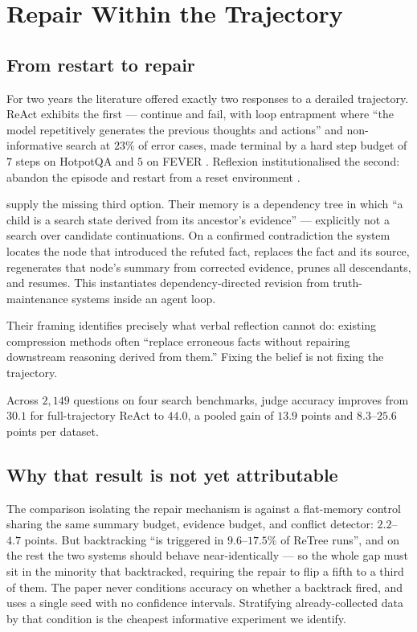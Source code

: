 \documentclass[10pt,twocolumn,a4paper]{article}
\begin{document}
\section{Repair Within the Trajectory}
\label{sec:repair}

\subsection{From restart to repair}

For two years the literature offered exactly two responses to a derailed trajectory.
ReAct exhibits the first --- continue and fail, with loop entrapment where ``the model
repetitively generates the previous thoughts and actions'' and non-informative search at
$23\%$ of error cases, made terminal by a hard step budget of $7$ steps on HotpotQA and $5$
on FEVER \citep{yao2023reactsynergizingreasoningacting}.
Reflexion institutionalised the second: abandon the episode and restart from a reset
environment \citep{shinn2023reflexionlanguageagentsverbal}.

\citet{yang2026selfcorrectinglonghorizonsearchagents} supply the missing third option.
Their memory is a dependency tree in which ``a child is a search state derived from its
ancestor's evidence'' --- explicitly not a search over candidate continuations.
On a confirmed contradiction the system locates the node that introduced the refuted fact,
replaces the fact and its source, regenerates that node's summary from corrected evidence,
prunes all descendants, and resumes.
This instantiates dependency-directed revision from truth-maintenance systems inside an
agent loop.

Their framing identifies precisely what verbal reflection cannot do: existing compression
methods often ``replace erroneous facts without repairing downstream reasoning derived from
them.''
Fixing the belief is not fixing the trajectory.

Across $2{,}149$ questions on four search benchmarks, judge accuracy improves from $30.1$
for full-trajectory ReAct to $44.0$, a pooled gain of $13.9$ points and $8.3$--$25.6$ points
per dataset.

\subsection{Why that result is not yet attributable}

The comparison isolating the repair mechanism is against a flat-memory control sharing the
same summary budget, evidence budget, and conflict detector: $2.2$--$4.7$ points.
But backtracking ``is triggered in $9.6$--$17.5\%$ of ReTree runs'', and on the rest the two
systems should behave near-identically --- so the whole gap must sit in the minority that
backtracked, requiring the repair to flip a fifth to a third of them.
The paper never conditions accuracy on whether a backtrack fired, and uses a single seed with
no confidence intervals.
Stratifying already-collected data by that condition is the cheapest informative experiment
we identify.
\end{document}

